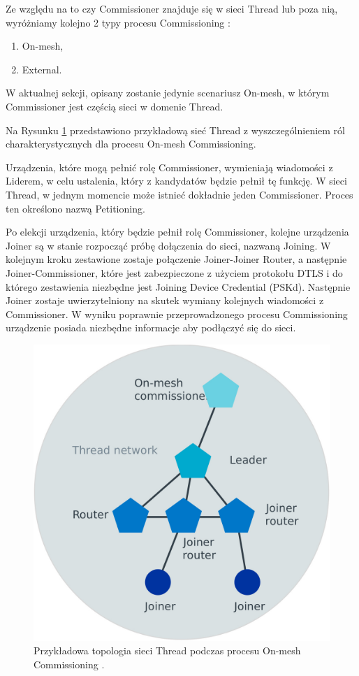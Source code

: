     Ze względu na to czy Commissioner znajduje się w sieci Thread lub poza nią, wyróżniamy kolejno 2 typy procesu Commissioning \cite{thread-commissioning}:
    \begin{enumerate}
        \item On-mesh,
        \item External.
    \end{enumerate}

    W aktualnej sekcji, opisany zostanie jedynie scenariusz On-mesh, w którym Commissioner jest częścią sieci w domenie Thread.

    Na Rysunku \ref{fig:thread-on-mesh-commissioning} przedstawiono przykładową sieć Thread z wyszczególnieniem ról charakterystycznych dla procesu On-mesh Commissioning.

    Urządzenia, które mogą pełnić rolę Commissioner, wymieniają wiadomości z Liderem, w celu ustalenia, który z kandydatów będzie pełnił tę funkcję. W sieci Thread, w jednym momencie może istnieć dokładnie jeden Commissioner. Proces ten określono nazwą Petitioning.

    Po elekcji urządzenia, który będzie pełnił rolę Commissioner, kolejne urządzenia Joiner są w stanie rozpocząć próbę dołączenia do sieci, nazwaną Joining.
    W kolejnym kroku zestawione zostaje połączenie Joiner-Joiner Router, a następnie Joiner-Commissioner, które jest zabezpieczone z użyciem protokołu DTLS i do którego zestawienia niezbędne jest Joining Device Credential (PSKd). Następnie Joiner zostaje uwierzytelniony na skutek wymiany kolejnych wiadomości z Commissioner. W wyniku poprawnie przeprowadzonego procesu Commissioning urządzenie posiada niezbędne informacje aby podłączyć się do sieci.

    \begin{figure}[H]
        \centering
        \includegraphics[width=0.8\linewidth]{graphics/external/Thread_on-mesh_commissioning.jpg}
        \caption{Przykładowa topologia sieci Thread podczas procesu On-mesh Commissioning \cite{thread-commissioning}.}
        \label{fig:thread-on-mesh-commissioning}
    \end{figure}

